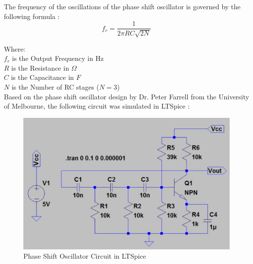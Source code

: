 The frequency of the oscillations of the phase shift oscillator is governed by the following formula \cite{psotutorial}:
\begin{equation}
	f_r = \frac{1}{2 \pi RC \sqrt{2N}}
	\label{frequencyoutput}
\end{equation} 

Where:  \\
$f_r$ is the Output Frequency in Hz \\
$R$ is the Resistance in $\Omega$ \\
$C$ is the Capacitance in $F$ \\
$N$ is the Number of RC stages ($N=3$) \\

Based on the phase shift oscillator design by Dr. Peter Farrell from the University of Melbourne, the following circuit was simulated in LTSpice \cite{peterfarrell}: 

\begin{figure}[H]
	\centering
	\includegraphics[width=0.7\linewidth]{psoltspice.jpg}
	\caption{Phase Shift Oscillator Circuit in LTSpice \cite{peterfarrell}}
	\label{psoltspice}
\end{figure}
